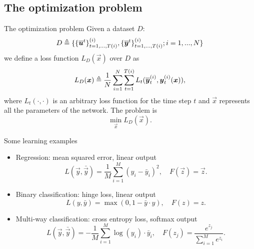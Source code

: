 \subsection{The optimization problem}
\begin{frame}{The optimization problem}
Given a dataset $D$:
\begin{equation}
	D\triangleq\{\{\overline{\boldsymbol{u}}^t\}_{t=1,...,T(i)}^{(i)}, \{\overline{\boldsymbol{y}}^t\}_{t=1,...,T(i)}^{(i)};  i=1,...,N\}
\end{equation}
we define a loss function $L_D(\vec{x})$ over $D$  as
\begin{equation}
L_D(\boldsymbol{x})\triangleq\frac{1}{N}\sum_{i=1}^N \sum_{t=1}^{T(i)} L_t(\overline{\boldsymbol{y}}_t^{(i)},\boldsymbol{y}_t^{(i)}(\boldsymbol{x})),
\end{equation}
where $L_t(\cdot, \cdot)$ is an arbitrary loss function for the time step $t$ and $\vec{x}$ represents all the parameters of the network.
The problem is \begin{equation}
\min_{\vec{x}} L_D(\vec{x}).
\end{equation}
\end{frame}

\begin{frame}{Some learning examples}

	\begin{itemize}
		\item Regression: mean squared error, linear output
		\begin{equation}
			L(\vec{y}, \bar{\vec{y}}) = \frac{1}{M}\sum_{i=1}^M (y_i-\bar{y}_i)^2, \quad F(\vec{z}) = \vec{z}.
		\end{equation}
		\item Binary classification: hinge loss, linear output
		\begin{equation}
			L(y, \bar{y}) = \max(0,1-\bar{y}\cdot y ), \quad F(z) = z.
		\end{equation}
		\item Multi-way classification: cross entropy loss, softmax output
		\begin{equation}
						L(\vec{y}, \bar{\vec{y}}) = -\frac{1}{M}\sum_{i=1}^M \log(y_i)\cdot \bar{y}_i, \quad F(z_j) = \frac{e^{z_j}}{\sum_{i=1}^M e^{z_i}}.
		\end{equation}
	\end{itemize}
\end{frame}

